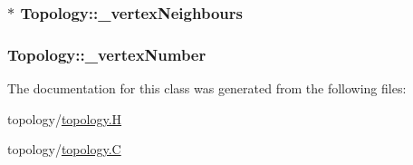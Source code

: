 \hypertarget{classTopology_ad8a74f2e5d075ae25040947b64e46c77}{
\subsubsection[{\_\-vertexNeighbours}]{$\ast$ {\bf Topology::\_\-vertexNeighbours}}}
\label{classTopology_ad8a74f2e5d075ae25040947b64e46c77}
\hypertarget{classTopology_a622029bc7be2f3f9cbcbd47530062c2a}{
\subsubsection[{\_\-vertexNumber}]{ {\bf Topology::\_\-vertexNumber}}}
\label{classTopology_a622029bc7be2f3f9cbcbd47530062c2a}


The documentation for this class was generated from the following files:\begin{DoxyCompactItemize}
\item 
topology/\hyperlink{topology_8H}{topology.H}\item 
topology/\hyperlink{topology_8C}{topology.C}\end{DoxyCompactItemize}
